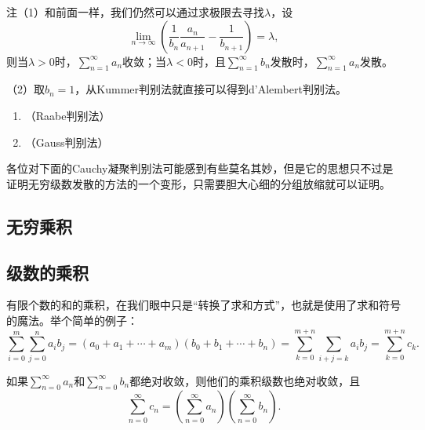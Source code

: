 {\heiti 注}（1）和前面一样，我们仍然可以通过求极限去寻找\(\lambda\)，设\[\lim\limits_{n\to\infty}\left(\frac{1}{b_n}\frac{a_n}{a_{n+1}}-\frac{1}{b_{n+1}}\right)=\lambda,\]则当\(\lambda>0\)时，\(\displaystyle\sum_{n=1}^{\infty}a_n\)收敛；当\(\lambda<0\)时，且\(\displaystyle\sum_{n=1}^{\infty}b_n\)发散时，\(\displaystyle\sum_{n=1}^{\infty}a_n\)发散。

（2）取\(b_n=1\)，从Kummer判别法就直接可以得到d'Alembert判别法。
\begin{corollary}
    \begin{enumerate}
        \item （Raabe判别法）
        \item （Gauss判别法）
    \end{enumerate}
\end{corollary}

各位对下面的Cauchy凝聚判别法可能感到有些莫名其妙，但是它的思想只不过是证明无穷级数发散的方法的一个变形，只需要胆大心细的分组放缩就可以证明。
\begin{theorem}[Cauchy凝聚判别法]
    
\end{theorem}
\subsection{无穷乘积}
\begin{definition}[无穷乘积]\label{def:数项级数:无穷乘积}
    
\end{definition}

\subsection{级数的乘积}
有限个数的和的乘积，在我们眼中只是“转换了求和方式”，也就是使用了求和符号的魔法。举个简单的例子：\[\sum_{i=0}^{m}\sum_{j=0}^{n}a_ib_j=(a_0+a_1+\cdots+a_m)(b_0+b_1+\cdots+b_n)=\sum_{k=0}^{m+n}\sum_{i+j=k}a_ib_j=\sum_{k=0}^{m+n}c_k.\]
\begin{definition}[Cauchy乘积]
    
\end{definition}
\begin{theorem}[Cauchy]\label{thm:数项级数:Cauchy定理}
    如果\(\sum\limits_{n=0}^{\infty}a_n\)和\(\sum\limits_{n=0}^{\infty}b_n\)都绝对收敛，则他们的乘积级数也绝对收敛，且\[\sum_{n=0}^{\infty}c_n=\left(\sum_{n=0}^{\infty}a_n\right)\left(\sum_{n=0}^{\infty}b_n\right).\]
\end{theorem}

